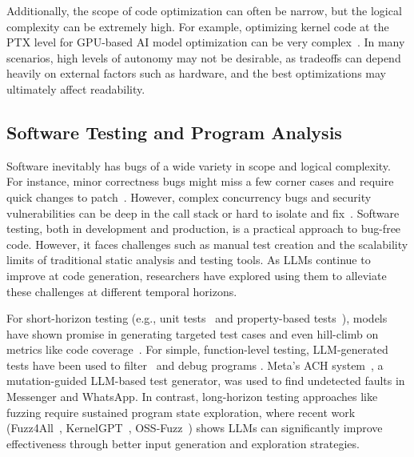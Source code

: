 Additionally, the scope of code optimization can often be narrow, but the logical complexity can be extremely high. For example, optimizing kernel code at the PTX level for GPU-based AI model optimization can be very complex~\citep{deepep2025, ouyang2024kernelbench}. In many scenarios, high levels of autonomy may not be desirable, as tradeoffs can depend heavily on external factors such as hardware, and the best optimizations may ultimately affect readability.



\subsection{Software Testing and Program Analysis}
Software inevitably has bugs of a wide variety in scope and logical complexity.
% 
For instance, minor correctness bugs might miss a few corner cases and require quick changes to patch~\citep{mosolygo2021rise}. However, complex concurrency bugs and security vulnerabilities can be deep in the call stack or hard to isolate and fix~\citep{concurrencylucene}.
% 
Software testing, both in development and production, is a practical approach to bug-free code. However, it faces challenges such as manual test creation and the scalability limits of traditional static analysis and testing tools. As LLMs continue to improve at code generation, researchers have explored using them to alleviate these challenges at different temporal horizons.

For short-horizon testing (e.g., unit tests~\citep{lemieux2023codamosa} and property-based tests~\citep{vikram2023can}), models have shown promise in generating targeted test cases \citep{mundler2025swt} and even hill-climb on metrics like code coverage~\citep{ryan2024code}. For simple, function-level testing, LLM-generated tests have been used to filter~\citep{chen2022codet, zhang2023algo} and debug programs \citep{chen2025revisit}. 
% 
% 
Meta's ACH system~\citep{foster2025mutation}, a mutation-guided LLM-based test generator, was used to find undetected faults in Messenger and WhatsApp.
% 
In contrast, long-horizon testing approaches like fuzzing require sustained program state exploration, where recent work (Fuzz4All~\citep{xia2024fuzz4all}, KernelGPT~\citep{yang2023kernelgpt}, OSS-Fuzz~\citep{ossfuzzllm, ossfuzzllm-results}) shows LLMs can significantly improve effectiveness through better input generation and exploration strategies.

